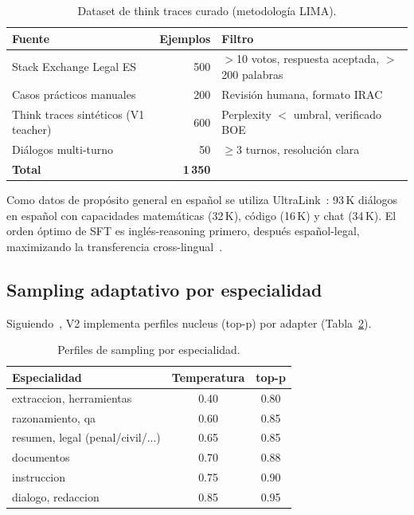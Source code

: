 \documentclass[11pt,a4paper]{article}
\begin{document}
\begin{table}[h]
\centering
\caption{Dataset de think traces curado (metodología LIMA).}
\label{tab:think_data}
\begin{tabular}{lrl}
\toprule
\textbf{Fuente} & \textbf{Ejemplos} & \textbf{Filtro} \\
\midrule
Stack Exchange Legal ES & 500 & $>$10 votos, respuesta aceptada, $>$200 palabras \\
Casos prácticos manuales & 200 & Revisión humana, formato IRAC \\
Think traces sintéticos (V1 teacher) & 600 & Perplexity $<$ umbral, verificado BOE \\
Diálogos multi-turno & 50 & $\geq$3 turnos, resolución clara \\
\midrule
\textbf{Total} & \textbf{1\,350} & \\
\bottomrule
\end{tabular}
\end{table}

Como datos de propósito general en español se utiliza UltraLink~\citep{ultralink2024}:
93\,K diálogos en español con capacidades matemáticas (32\,K), código (16\,K) y chat
(34\,K). El orden óptimo de SFT es inglés-reasoning primero, después español-legal,
maximizando la transferencia cross-lingual~\citep{ultralink2024}.

\subsection{Sampling adaptativo por especialidad}

Siguiendo~\citet{holtzman2020curious}, V2 implementa perfiles nucleus (top-p) por
adapter (Tabla~\ref{tab:sampling}).

\begin{table}[h]
\centering
\caption{Perfiles de sampling por especialidad.}
\label{tab:sampling}
\begin{tabular}{lcc}
\toprule
\textbf{Especialidad} & \textbf{Temperatura} & \textbf{top-p} \\
\midrule
extraccion, herramientas & 0.40 & 0.80 \\
razonamiento, qa         & 0.60 & 0.85 \\
resumen, legal (penal/civil/...) & 0.65 & 0.85 \\
documentos               & 0.70 & 0.88 \\
instruccion              & 0.75 & 0.90 \\
dialogo, redaccion       & 0.85 & 0.95 \\
\bottomrule
\end{tabular}
\end{table}
\end{document}
